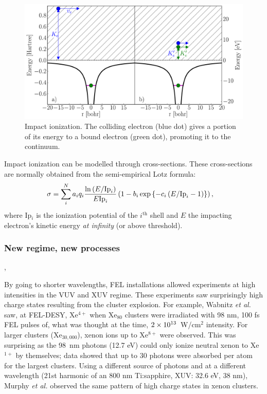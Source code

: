 \begin{figure}
 \centering
 \includegraphics[width=\figurewidth]{figures/ionization_impact}
 \caption{Impact ionization. The colliding electron (blue dot) gives a portion
          of its energy to a bound electron (green dot), promoting it to the
          continuum.}
 \label{fig:ionization:impact}
\end{figure}

Impact ionization can be modelled through cross-sections. These
cross-sections are normally obtained from the semi-empirical Lotz
formula\cite{Lotz1967}:
\begin{align}
\sigma & = \sum_{i}^{N} a_i q_i \frac{\ln{\left( E/\textrm{Ip}_i \right)}}{E \textrm{Ip}_i} \left( 1 - b_i
\exp{ \left\{ -c_i \left( E/\textrm{Ip}_i - 1 \right) \right\}} \right),
\label{eqn:impact:ionization:lotz}
\end{align}
where Ip$_i$ is the ionization potential of the $i^{\textrm{th}}$ shell and $E$
the impacting electron's kinetic energy \textit{at infinity} (or above threshold).

\subsubsection{New regime, new processes}
\label{section:intro:mechanisms:new},

By going to shorter wavelengths, FEL installations allowed experiments at high
intensities in the VUV and XUV regime. These experiments saw surprisingly
high charge states resulting from the cluster
explosion\cite{Wabnitz2002,Bostedt2010}. For example, Wabnitz \textit{et al.}
saw, at FEL-DESY, Xe$^{4+}$ when Xe$_{80}$ clusters were irradiated with 98 nm,
100 fs FEL pulses of, what was thought at the time, $\ten{2}{13}$~W/cm$^2$
intensity. For larger clusters (Xe$_{30,000}$), xenon ions up to
Xe$^{8+}$ were observed. This was surprising as the 98~nm
photons (12.7 eV) could only ionize neutral xenon to Xe$^{1+}$ by themselves;
data showed that up to 30 photons were absorbed per atom for the largest
clusters. Using a different source of photons and at a different wavelength
(21st harmonic of an 800 nm Ti:sapphire, XUV: 32.6 eV, 38 nm),
Murphy \textit{et al.} observed the same pattern of high charge states in xenon
clusters\cite{Murphy2008a,Murphy2008b}.

